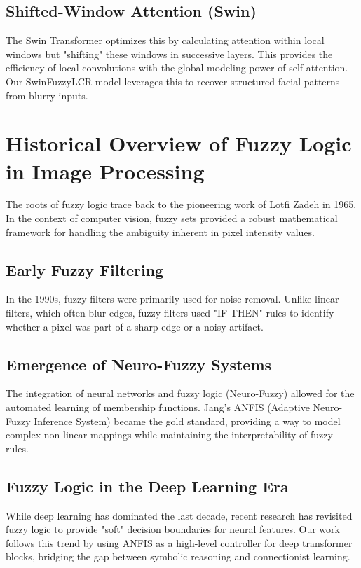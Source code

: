 \subsection{Shifted-Window Attention (Swin)}
The Swin Transformer optimizes this by calculating attention within local windows but "shifting" these windows in successive layers. This provides the efficiency of local convolutions with the global modeling power of self-attention. Our SwinFuzzyLCR model leverages this to recover structured facial patterns from blurry inputs.

\section{Historical Overview of Fuzzy Logic in Image Processing}
The roots of fuzzy logic trace back to the pioneering work of Lotfi Zadeh in 1965. In the context of computer vision, fuzzy sets provided a robust mathematical framework for handling the ambiguity inherent in pixel intensity values.

\subsection{Early Fuzzy Filtering}
In the 1990s, fuzzy filters were primarily used for noise removal. Unlike linear filters, which often blur edges, fuzzy filters used "IF-THEN" rules to identify whether a pixel was part of a sharp edge or a noisy artifact.

\subsection{Emergence of Neuro-Fuzzy Systems}
The integration of neural networks and fuzzy logic (Neuro-Fuzzy) allowed for the automated learning of membership functions. Jang's ANFIS (Adaptive Neuro-Fuzzy Inference System) became the gold standard, providing a way to model complex non-linear mappings while maintaining the interpretability of fuzzy rules.

\subsection{Fuzzy Logic in the Deep Learning Era}
While deep learning has dominated the last decade, recent research has revisited fuzzy logic to provide "soft" decision boundaries for neural features. Our work follows this trend by using ANFIS as a high-level controller for deep transformer blocks, bridging the gap between symbolic reasoning and connectionist learning.

